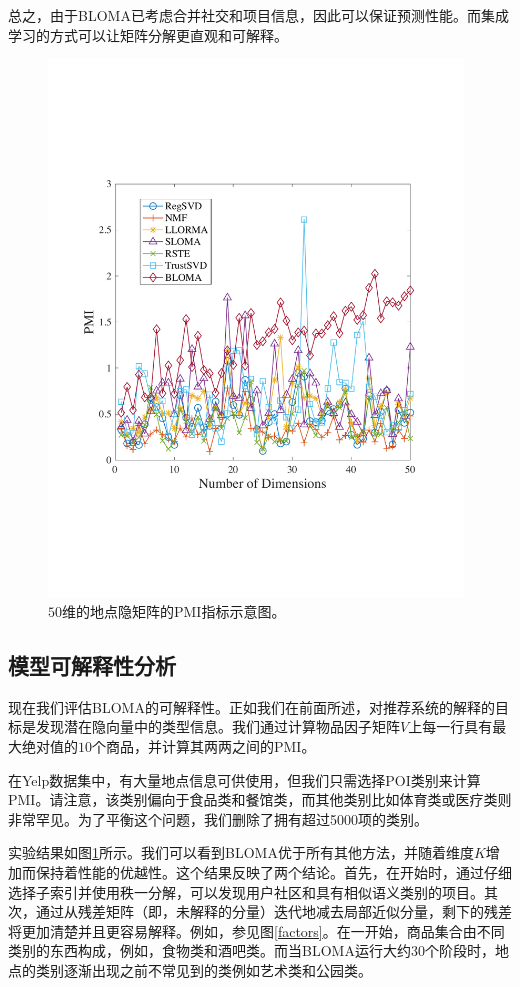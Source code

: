 总之，由于BLOMA已考虑合并社交和项目信息，因此可以保证预测性能。而集成学习的方式可以让矩阵分解更直观和可解释。


\begin{figure}[t!]
\centering
\includegraphics[width=110mm]{pics/pmi.pdf}
\caption{$50$维的地点隐矩阵的PMI指标示意图。} 
\label{pmi}
\end{figure}
\subsection{模型可解释性分析}

现在我们评估BLOMA的可解释性。正如我们在前面所述，对推荐系统的解释的目标是发现潜在隐向量中的类型信息。我们通过计算物品因子矩阵$V$上每一行具有最大绝对值的$10$个商品，并计算其两两之间的PMI。

在Yelp数据集中，有大量地点信息可供使用，但我们只需选择POI类别来计算PMI。请注意，该类别偏向于食品类和餐馆类，而其他类别比如体育类或医疗类则非常罕见。为了平衡这个问题，我们删除了拥有超过5000项的类别。

实验结果如图\ref{pmi}所示。我们可以看到BLOMA优于所有其他方法，并随着维度$ K $增加而保持着性能的优越性。这个结果反映了两个结论。首先，在开始时，通过仔细选择子索引并使用秩一分解，可以发现用户社区和具有相似语义类别的项目。其次，通过从残差矩阵（即，未解释的分量）迭代地减去局部近似分量，剩下的残差将更加清楚并且更容易解释。例如，参见图\ref{factors}。在一开始，商品集合由不同类别的东西构成，例如，食物类和酒吧类。而当BLOMA运行大约30个阶段时，地点的类别逐渐出现之前不常见到的类例如艺术类和公园类。

